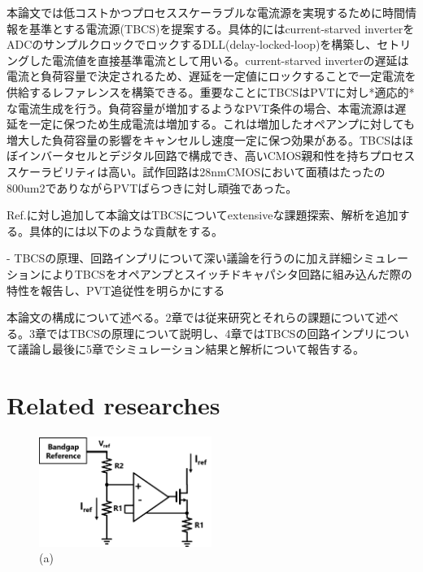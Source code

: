 \documentclass[letterpaper, 10 pt, conference]{ieeeconf}  %
\begin{document}
本論文では低コストかつプロセススケーラブルな電流源を実現するために時間情報を基準とする電流源(TBCS)を提案する\cite{yoshioka201728}。具体的にはcurrent-starved inverterをADCのサンプルクロックでロックするDLL(delay-locked-loop)を構築し、セトリングした電流値を直接基準電流として用いる。current-starved inverterの遅延は電流と負荷容量で決定されるため、遅延を一定値にロックすることで一定電流を供給するレファレンスを構築できる。重要なことにTBCSはPVTに対し*適応的*な電流生成を行う。負荷容量が増加するようなPVT条件の場合、本電流源は遅延を一定に保つため生成電流は増加する。これは増加したオペアンプに対しても増大した負荷容量の影響をキャンセルし速度一定に保つ効果がある。TBCSはほぼインバータセルとデジタル回路で構成でき、高いCMOS親和性を持ちプロセススケーラビリティは高い。試作回路は28nmCMOSにおいて面積はたったの800um2でありながらPVTばらつきに対し頑強であった。

Ref.\cite{yoshioka201728}に対し追加して本論文はTBCSについてextensiveな課題探索、解析を追加する。具体的には以下のような貢献をする。

- TBCSの原理、回路インプリについて深い議論を行うのに加え詳細シミュレーションによりTBCSをオペアンプとスイッチドキャパシタ回路に組み込んだ際の特性を報告し、PVT追従性を明らかにする

本論文の構成について述べる。2章では従来研究とそれらの課題について述べる。3章ではTBCSの原理について説明し、4章ではTBCSの回路インプリについて議論し最後に5章でシミュレーション結果と解析について報告する。

\section{Related researches}
\begin{figure}[!]
\centering
 \includegraphics[width=0.5\textwidth]{figs/fig1.png}
  \caption{(a) 
}
\label{fig2}
\end{figure}
\end{document}
